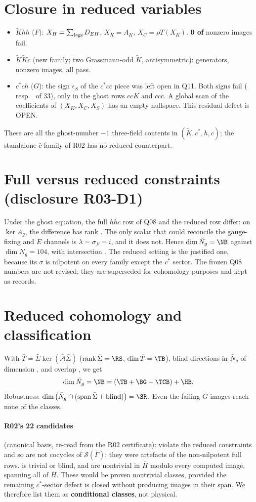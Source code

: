 \documentclass[11pt]{article}
\begin{document}
\section{Closure in reduced variables}
\begin{itemize}
\item $\tilde K hh$ ($F$): $X_H=\sum_{\rm legs}D_{EH}$, $X_K=A_K$, $X_C=\rho T(X_K)$. \textbf{0 of \NF} nonzero images fail.
\item $\tilde K\tilde K c$ (new family; two Grassmann-odd $\tilde K$, antisymmetric): \NKG{} generators, \NK{} nonzero images, all pass.
\item $c^*ch$ ($G$): the sign $\epsilon_S$ of the $c^*cc$ piece was left open in Q11. Both signs fail (\GM{} resp.\ \GP{} of 33), only
in the ghost rows $ccK$ and $cc\bar c$. A global scan of the coefficients of $(X_K,X_C,X_S)$ has an empty nullspace. This residual defect is OPEN.
\end{itemize}
These are all the ghost-number $-1$ three-field contents in $(\tilde K,c^*,h,c)$; the standalone $\bar c$ family of R02 has no reduced counterpart.

\section{Full versus reduced constraints (disclosure R03-D1)}
Under the ghost equation, the full $hhc$ row of Q08 and the reduced row differ: on $\ker A_g$, the difference has rank \EQ. The
only scalar that could reconcile the gauge-fixing and $E$ channels is $\lambda=\sigma_F=i$, and it does not. Hence
$\dim\bar N_g=\NB$ against $\dim N_g=104$, with intersection \NI. The reduced setting is the justified one, because its
$\sigma$ is nilpotent on every family except the $c^*$ sector. The frozen Q08 numbers are not revised; they are superseded for
cohomology purposes and kept as records.

\section{Reduced cohomology and classification}
With $\bar T=\bar\Sigma\ker(\bar{\mathcal A}\bar\Sigma)$ ($\operatorname{rank}\bar\Sigma=\RS$, $\dim\bar T=\TB$), blind directions in
$\bar N_g$ of dimension \BG{}, and overlap \TCB, we get
\[\dim\bar N_g=\NB=(\TB+\BG-\TCB)+\HB .\]
Robustness: $\dim\big(\bar N_g\cap(\operatorname{span}\bar\Sigma+\text{blind})\big)=\SR$. Even the failing $G$ images reach none of the \HB{} classes.
\paragraph{R02's 22 candidates} (canonical basis, re-read from the R02 certificate): \TA{} violate the reduced
constraints and so are not cocycles of $\mathcal S(\bar\Gamma)$; they were artefacts of the non-nilpotent full rows. \TT{} is trivial or blind,
and \TN{} are nontrivial in $\bar H$ modulo every computed image, spanning all of $\bar H$. These would be proven
nontrivial classes, provided the remaining $c^*$-sector defect is closed without producing images in their span. We therefore list them as
\textbf{conditional classes}, not physical.
\end{document}
